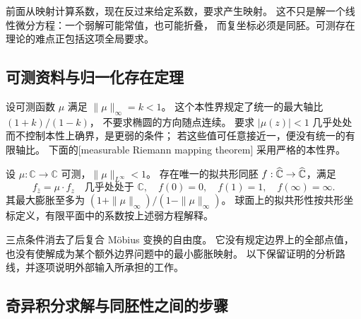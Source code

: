 前面从映射计算系数，现在反过来给定系数，要求产生映射。
这不只是解一个线性微分方程：一个弱解可能常值，也可能折叠，
而复坐标必须是同胚。可测存在理论的难点正包括这项全局要求。

\subsection{可测资料与归一化存在定理}
\label{b3:subsec:B0401}

设可测函数 \(\mu\) 满足 \(\|\mu\|_\infty=k<1\)。
这个本性界规定了统一的最大轴比 \((1+k)/(1-k)\)，
不要求椭圆的方向随点连续。
要求 \(|\mu(z)|<1\) 几乎处处而不控制本性上确界，是更弱的条件；
若这些值可任意接近一，便没有统一的有限轴比。
下面的[measurable Riemann mapping theorem]
采用严格的本性界。

\begin{theorem}\label{b3:thm:B-measurable-riemann}
设 \(\mu:\mathbb C\rightarrow\mathbb C\) 可测，\(\|\mu\|_{L^\infty}<1\)。
存在唯一的拟共形同胚
\(f:\widehat{\mathbb C\kern0pt}\rightarrow\widehat{\mathbb C\kern0pt}\)，满足
\[
 f_{\bar z}=\mu\cdot f_z\quad\text{几乎处处于 }\mathbb C,
 \quad f(0)=0,\quad f(1)=1,\quad f(\infty)=\infty.
\]
其最大膨胀至多为 \((1+\|\mu\|_\infty)/(1-\|\mu\|_\infty)\)。
球面上的拟共形性按共形坐标定义，有限平面中的系数按上述弱方程解释。
\end{theorem}
三点条件消去了后复合 Möbius 变换的自由度。
它没有规定边界上的全部点值，也没有使解成为某个额外边界问题中的最小膨胀映射。
以下保留证明的分析路线，并逐项说明外部输入所承担的工作。

\subsection{奇异积分求解与同胚性之间的步骤}
\label{b3:subsec:B0402}

